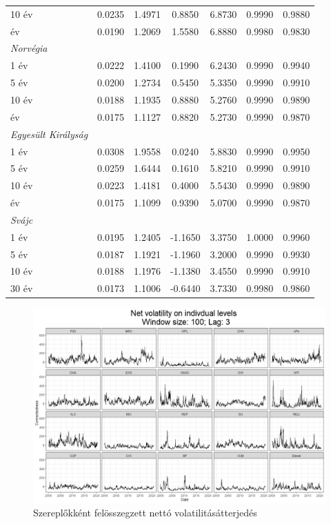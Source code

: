 \documentclass[12pt,bibliography=totoc]{article}
\begin{document}
\begin{appendices}
\begin{table}[H]
\begin{tabular}{l c c c c c c}
10 év	&	0.0235	&	1.4971	&	0.8850	&	6.8730	&	0.9990	&	0.9880	\\
\medskip													
30 év	&	0.0190	&	1.2069	&	1.5580	&	6.8880	&	0.9980	&	0.9830	\\
\textit{Norvégia}	&		&		&		&		&		&		\\
1 év	&	0.0222	&	1.4100	&	0.1990	&	6.2430	&	0.9990	&	0.9940	\\
5 év	&	0.0200	&	1.2734	&	0.5450	&	5.3350	&	0.9990	&	0.9910	\\
10 év	&	0.0188	&	1.1935	&	0.8880	&	5.2760	&	0.9990	&	0.9890	\\
\medskip													
30 év	&	0.0175	&	1.1127	&	0.8820	&	5.2730	&	0.9990	&	0.9870	\\
\textit{Egyesült Királyság}	&		&		&		&		&		&		\\
1 év	&	0.0308	&	1.9558	&	0.0240	&	5.8830	&	0.9990	&	0.9950	\\
5 év	&	0.0259	&	1.6444	&	0.1610	&	5.8210	&	0.9990	&	0.9910	\\
10 év	&	0.0223	&	1.4181	&	0.4000	&	5.5430	&	0.9990	&	0.9890	\\
\medskip													
30 év	&	0.0175	&	1.1099	&	0.9390	&	5.0700	&	0.9990	&	0.9870	\\
\textit{Svájc}	&		&		&		&		&		&		\\
1 év	&	0.0195	&	1.2405	&	-1.1650	&	3.3750	&	1.0000	&	0.9960	\\
5 év	&	0.0187	&	1.1921	&	-1.1960	&	3.2000	&	0.9990	&	0.9930	\\
10 év	&	0.0188	&	1.1976	&	-1.1380	&	3.4550	&	0.9990	&	0.9910	\\
30 év	&	0.0173	&	1.1006	&	-0.6440	&	3.7330	&	0.9980	&	0.9860	\\

\hline%
\end{tabular}
\label{table:nonlin}%
\end{table}


\begin{figure}[ht]
\caption{Szereplőkként felösszegzett nettó volatilitásátterjedés}
\includegraphics[width=17cm]{vol_net}
\centering
\end{figure}


\end{appendices}
\end{document}
